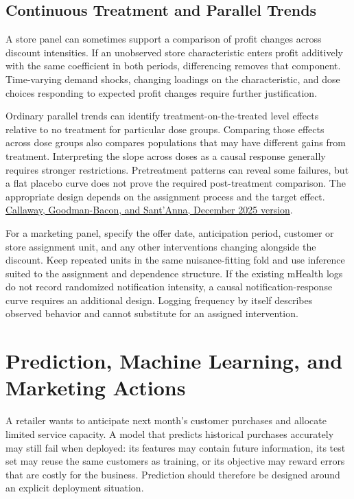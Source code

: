 \hypertarget{M06-continuous-treatment-and-parallel-trends}{%
\section{Continuous Treatment and Parallel
Trends}\label{M06-continuous-treatment-and-parallel-trends}}

\noindent \noindent A store panel can sometimes support a comparison of profit
changes across discount intensities. If an unobserved store
characteristic enters profit additively with the same coefficient in
both periods, differencing removes that component. Time-varying demand
shocks, changing loadings on the characteristic, and dose choices
responding to expected profit changes require further justification.

Ordinary parallel trends can identify treatment-on-the-treated level
effects relative to no treatment for particular dose groups. Comparing
those effects across dose groups also compares populations that may have
different gains from treatment. Interpreting the slope across doses as a
causal response generally requires stronger restrictions. Pretreatment
patterns can reveal some failures, but a flat placebo curve does not
prove the required post-treatment comparison. The appropriate design
depends on the assignment process and the target effect.
\href{https://arxiv.org/abs/2107.02637v8}{Callaway, Goodman-Bacon, and
Sant'Anna, December 2025 version}.

For a marketing panel, specify the offer date, anticipation period,
customer or store assignment unit, and any other interventions changing
alongside the discount. Keep repeated units in the same nuisance-fitting
fold and use inference suited to the assignment and dependence
structure. If the existing mHealth logs do not record randomized
notification intensity, a causal notification-response curve requires an
additional design. Logging frequency by itself describes observed
behavior and cannot substitute for an assigned intervention.

\hypertarget{M07-m7.-prediction-machine-learning-and-marketing-actions}{%
\chapter{Prediction, Machine Learning, and Marketing
Actions}\label{M07-m7.-prediction-machine-learning-and-marketing-actions}}

\noindent A retailer wants to anticipate next month's customer purchases and
allocate limited service capacity. A model that predicts historical
purchases accurately may still fail when deployed: its features may
contain future information, its test set may reuse the same customers as
training, or its objective may reward errors that are costly for the
business. Prediction should therefore be designed around an explicit
deployment situation.

